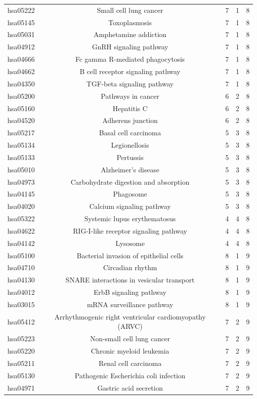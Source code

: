 \begin{center}
\begin{longtable}{@{}ccccc@{}}
hsa05222	&Small cell lung cancer&	7&	1&	8\\
hsa05145	&Toxoplasmosis&	7&	1&	8\\
hsa05031	&Amphetamine addiction&	7&	1&	8\\
hsa04912	&GnRH signaling pathway	&7&	1&	8\\
hsa04666	&Fc gamma R-mediated phagocytosis&	7&	1&	8\\
hsa04662	&B cell receptor signaling pathway&	7&	1&	8\\
hsa04350	&TGF-beta signaling pathway&	7&	1&	8\\
hsa05200	&Pathways in cancer&	6&	2&	8\\
hsa05160	&Hepatitis C&	6&	2&	8\\
hsa04520	&Adherens junction&	6&	2&	8\\
hsa05217	&Basal cell carcinoma&	5&	3&	8\\
hsa05134	&Legionellosis&	5&	3&	8\\
hsa05133	&Pertussis&	5&	3&	8\\
hsa05010	&Alzheimer's disease&	5&	3&	8\\
hsa04973	&Carbohydrate digestion and absorption&	5&	3&	8\\
hsa04145	&Phagosome&	5&	3&	8\\
hsa04020	&Calcium signaling pathway&	5&	3&	8\\
hsa05322	&Systemic lupus erythematosus&	4&	4&	8\\
hsa04622	&RIG-I-like receptor signaling pathway&	4&	4&	8\\
hsa04142	&Lysosome&	4&	4&	8\\
hsa05100	&Bacterial invasion of epithelial cells&	8&	1&	9\\
hsa04710	&Circadian rhythm&	8&	1&	9\\
hsa04130	&SNARE interactions in vesicular transport&	8&	1&	9\\
hsa04012	&ErbB signaling pathway&	8&	1&	9\\
hsa03015	&mRNA surveillance pathway&	8&	1&	9\\
hsa05412	&Arrhythmogenic right ventricular cardiomyopathy (ARVC)&	7&	2&	9\\
hsa05223	&Non-small cell lung cancer&	7&	2&	9\\
hsa05220	&Chronic myeloid leukemia&	7&	2&	9\\
hsa05211	&Renal cell carcinoma&	7&	2&	9\\
hsa05130	&Pathogenic Escherichia coli infection&	7&	2&	9\\
hsa04971	&Gastric acid secretion&	7&	2&	9\\

\end{longtable}
\end{center}
